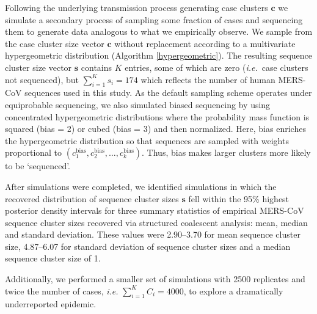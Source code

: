 \documentclass[11pt,oneside,letterpaper]{article}
\begin{document}
Following the underlying transmission process generating case clusters $\mathbf{c}$ we simulate a secondary process of sampling some fraction of cases and sequencing them to generate data analogous to what we empirically observe.
We sample from the case cluster size vector $\mathbf{c}$ without replacement according to a multivariate hypergeometric distribution (Algorithm \ref{hypergeometric}).
The resulting sequence cluster size vector $\mathbf{s}$ contains $K$ entries, some of which are zero (\textit{i.e.}\ case clusters not sequenced), but $\sum_{i=1}^{K} s_i = 174$ which reflects the number of human MERS-CoV sequences used in this study.
As the default sampling scheme operates under equiprobable sequencing, we also simulated biased sequencing by using concentrated hypergeometric distributions where the probability mass function is squared (bias = 2) or cubed (bias = 3) and then normalized.
Here, bias enriches the hypergeometric distribution so that sequences are sampled with weights proportional to $(c_1^\mathrm{bias}, c_2^\mathrm{bias}, \ldots, c_k^\mathrm{bias})$.
Thus, bias makes larger clusters more likely to be `sequenced'.

After simulations were completed, we identified simulations in which the recovered distribution of sequence cluster sizes $\mathbf{s}$ fell within the 95\% highest posterior density intervals for three summary statistics of empirical MERS-CoV sequence cluster sizes recovered via structured coalescent analysis: mean, median and standard deviation.
These values were 2.90--3.70 for mean sequence cluster size, 4.87--6.07 for standard deviation of sequence cluster sizes and a median sequence cluster size of 1.

Additionally, we performed a smaller set of simulations with 2500 replicates and twice the number of cases, \textit{i.e.} $\sum_{i=1}^{K} C_{i} = 4000$, to explore a dramatically underreported epidemic.
\end{document}
